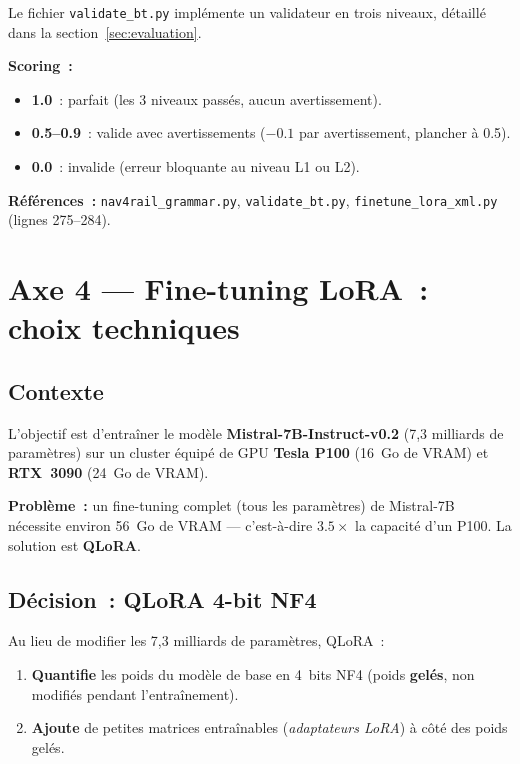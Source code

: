 \documentclass[a4paper,11pt]{article}
\newcommand{\file}[1]{\texttt{#1}}
\begin{document}
Le fichier \file{validate\_bt.py} implémente un validateur en trois
niveaux, détaillé dans la section~\ref{sec:evaluation}.

\textbf{Scoring~:}
\begin{itemize}
    \item \textbf{1.0}~: parfait (les 3 niveaux passés, aucun avertissement).
    \item \textbf{0.5--0.9}~: valide avec avertissements
    ($-0.1$ par avertissement, plancher à 0.5).
    \item \textbf{0.0}~: invalide (erreur bloquante au niveau L1 ou L2).
\end{itemize}

\textbf{Références~:} \file{nav4rail\_grammar.py},
\file{validate\_bt.py}, \file{finetune\_lora\_xml.py} (lignes 275--284).

\newpage
\section{Axe 4 --- Fine-tuning LoRA~: choix techniques}
\label{sec:lora}

\subsection{Contexte}

L'objectif est d'entraîner le modèle \textbf{Mistral-7B-Instruct-v0.2}
(7,3 milliards de paramètres) sur un cluster équipé de GPU
\textbf{Tesla P100} (16~Go de VRAM) et \textbf{RTX~3090} (24~Go de VRAM).

\textbf{Problème~:} un fine-tuning complet (tous les paramètres) de
Mistral-7B nécessite environ 56~Go de VRAM --- c'est-à-dire $3.5\times$ la
capacité d'un P100. La solution est \textbf{QLoRA}.

\subsection{Décision~: QLoRA 4-bit NF4}

Au lieu de modifier les 7,3 milliards de paramètres, QLoRA~:

\begin{enumerate}
    \item \textbf{Quantifie} les poids du modèle de base en 4~bits NF4
    (poids \textbf{gelés}, non modifiés pendant l'entraînement).
    \item \textbf{Ajoute} de petites matrices entraînables (\emph{adaptateurs
    LoRA}) à côté des poids gelés.
\end{enumerate}
\end{document}

